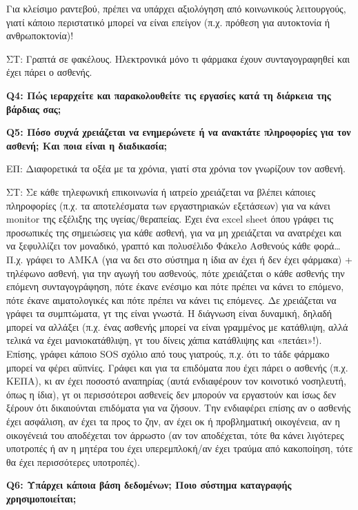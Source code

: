 Για κλείσιμο ραντεβού, πρέπει να υπάρχει αξιολόγηση από κοινωνικούς λειτουργούς, γιατί κάποιο περιστατικό μπορεί να είναι επείγον (π.χ. πρόθεση για αυτοκτονία ή ανθρωποκτονία)!

ΣΤ: Γραπτά σε φακέλους. Ηλεκτρονικά μόνο τι φάρμακα έχουν συνταγογραφηθεί και έχει πάρει ο ασθενής.

\textbf{Q4:	Πώς ιεραρχείτε και παρακολουθείτε τις εργασίες κατά τη διάρκεια της βάρδιας σας;}

\textbf{Q5:	Πόσο συχνά χρειάζεται να ενημερώνετε ή να ανακτάτε πληροφορίες για τον ασθενή; Και ποια είναι η διαδικασία;} 

ΕΠ: Διαφορετικά τα οξέα με τα χρόνια, γιατί στα χρόνια τον γνωρίζουν τον ασθενή.

ΣΤ: Σε κάθε τηλεφωνική επικοινωνία ή ιατρείο χρειάζεται να βλέπει κάποιες πληροφορίες (π.χ. τα αποτελέσματα των εργαστηριακών εξετάσεων) για να κάνει monitor της εξέλιξης της υγείας/θεραπείας. Έχει ένα excel sheet όπου γράφει τις προσωπικές της σημειώσεις για κάθε ασθενή, για να μη χρειάζεται να ανατρέχει και να ξεφυλλίζει τον μοναδικό, γραπτό και πολυσέλιδο Φάκελο Ασθενούς κάθε φορά… Π.χ. γράφει το ΑΜΚΑ (για να δει στο σύστημα η ίδια αν έχει ή δεν έχει φάρμακα) + τηλέφωνο ασθενή, για την αγωγή του ασθενούς, πότε χρειάζεται ο κάθε ασθενής την επόμενη συνταγογράφηση, πότε έκανε ενέσιμο και πότε πρέπει να κάνει το επόμενο, πότε έκανε αιματολογικές και πότε πρέπει να κάνει τις επόμενες. Δε χρειάζεται να γράφει τα συμπτώματα, γτ της είναι γνωστά. Η διάγνωση είναι δυναμική, δηλαδή μπορεί να αλλάξει (π.χ. ένας ασθενής μπορεί να είναι γραμμένος με κατάθλιψη, αλλά τελικά να έχει μανιοκατάθλιψη, γτ του δίνεις χάπια κατάθλιψης και «πετάει»!). Επίσης, γράφει κάποιο SOS σχόλιο από τους γιατρούς, π.χ. ότι το τάδε φάρμακο μπορεί να φέρει αϋπνίες. Γράφει και για τα επιδόματα που έχει πάρει ο ασθενής (π.χ. ΚΕΠΑ), κι αν έχει ποσοστό αναπηρίας (αυτά ενδιαφέρουν τον κοινοτικό νοσηλευτή, όπως η ίδια), γτ οι περισσότεροι ασθενείς δεν μπορούν να εργαστούν και ίσως δεν ξέρουν ότι δικαιούνται επιδόματα για να ζήσουν. Την ενδιαφέρει επίσης αν ο ασθενής έχει ασφάλιση, αν έχει τα προς το ζην, αν έχει οκ ή προβληματική οικογένεια, αν η οικογένειά του αποδέχεται τον άρρωστο (αν τον αποδέχεται, τότε θα κάνει λιγότερες υποτροπές ή αν η μητέρα του έχει υπερεμπλοκή/αν έχει τραύμα από κακοποίηση, τότε θα έχει περισσότερες υποτροπές).

\textbf{Q6:	Υπάρχει κάποια βάση δεδομένων; Ποιο σύστημα καταγραφής χρησιμοποιείται;}

